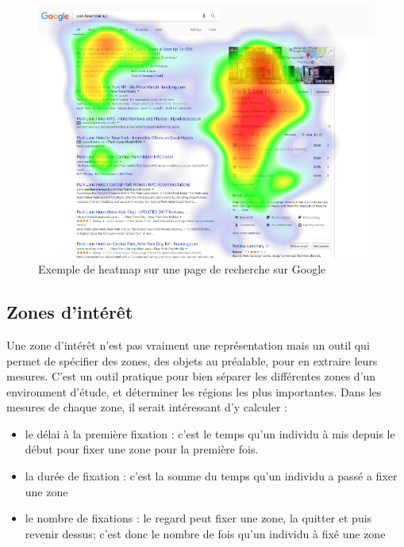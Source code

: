 \documentclass[12pt]{article}
\begin{document}
\begin{figure}[ht]
  \includegraphics[width=\textwidth,keepaspectratio=true]{heatmap.png}
  \caption{Exemple de heatmap sur une page de recherche sur Google
    \cite{img:heatmap}}
  \label{fig:heatmap}
\end{figure}

\subsection{Zones d'intérêt}

Une zone d'intérêt n'est pas vraiment une représentation mais un outil qui
permet de spécifier des zones, des objets au préalable, pour en extraire leurs
mesures. C'est un outil pratique pour bien séparer les différentes zones d'un
environment d'étude, et déterminer les régions les plus importantes. Dans les
mesures de chaque zone, il serait intéressant d'y calculer :

\begin{itemize}
  \item le délai à la première fixation : c'est le temps qu'un individu à mis
        depuis le début pour fixer une zone pour la première fois.
  \item la durée de fixation : c'est la somme du temps qu'un individu a passé a
        fixer une zone
  \item le nombre de fixations : le regard peut fixer une zone, la quitter et
        puis revenir dessus; c'est donc le nombre de fois qu'un individu à fixé
        une zone
\end{itemize}
\end{document}
